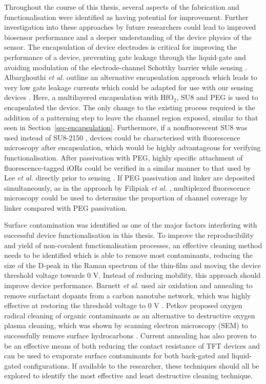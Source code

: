 \documentclass[
  a4paper,
]{scrbook}
\begin{document}
Throughout the course of this thesis, several aspects of the fabrication
and functionalisation were identified as having potential for
improvement. Further investigation into these approaches by future
researchers could lead to improved biosensor performance and a deeper
understanding of the device physics of the sensor. The encapsulation of
device electrodes is critical for improving the performance of a device,
preventing gate leakage through the liquid-gate and avoiding modulation
of the electrode-channel Schottky barrier while sensing
\autocite{Lim2014,Albarghouthi2022,Heller2008}. Albarghouthi \emph{et
al.} outline an alternative encapsulation approach which leads to very
low gate leakage currents which could be adapted for use with our
sensing devices \autocite{Albarghouthi2022}. Here, a multilayered
encapsulation with HfO\(_2\), SU8 and PEG is used to encapsulated the
device. The only change to the existing process required is the addition
of a patterning step to leave the channel region exposed, similar to
that seen in Section~\ref{sec-encapsulation}. Furthermore, if a
nonfluorescent SU8 was used instead of SU8-2150 \autocite{Vobornik2023},
devices could be characterised with fluorescence microscopy after
encapsulation, which would be highly advantageous for verifying
functionalisation. After passivation with PEG, highly specific
attachment of fluorescence-tagged iORs could be verified in a similar
manner to that used by Lee \emph{et al.} directly prior to sensing
\autocite{Lee2012b}. If PEG passivation and linker are deposited
simultaneously, as in the approach by Filipiak \emph{et al.}
\autocite{Filipiak2018}, multiplexed fluorescence microscopy could be
used to determine the proportion of channel coverage by linker compared
with PEG passivation.

Surface contamination was identified as one of the major factors
interfering with successful device functionalisation in this thesis. To
improve the reproducibility and yield of non-covalent functionalisation
processes, an effective cleaning method needs to be identified which is
able to remove most contaminants, reducing the size of the D-peak in the
Raman spectrum of the thin-film and moving the device threshold voltage
towards 0 V. Instead of reducing mobility, this approach should improve
device performance. Barnett \emph{et al.} used air oxidation and
annealing to remove surfactant dopants from a carbon nanotube network,
which was highly effective at restoring the threshold voltage to 0 V
\autocite{Barnett2018}. Petkov proposed oxygen radical cleaning of
organic contaminants as an alternative to destructive oxygen plasma
cleaning, which was shown by scanning electron microscopy (SEM) to
successfully remove surface hydrocarbons \autocite{Petkov2005}. Current
annealing has also proven to be an effective means of both reducing the
contact resistance of TFT devices \autocite{Schnitzspan2020} and can be
used to evaporate surface contaminants for both back-gated
\autocite{Ramamoorthy2018} and liquid-gated \autocite{Kireev2017}
configurations. If available to the researcher, these techniques should
all be explored to identify the most effective and least destructive
cleaning technique.
\end{document}
